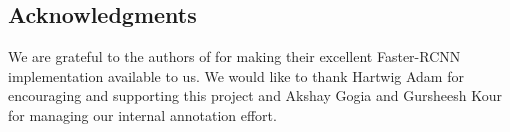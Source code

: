 \documentclass[10pt,twocolumn,letterpaper]{article}
\begin{document}
\subsection*{Acknowledgments}

We are grateful to the authors of \cite{huang2016speed} for making their excellent Faster-RCNN implementation available to us. We would like to thank Hartwig Adam for encouraging and supporting this project and Akshay Gogia and Gursheesh Kour for managing our internal annotation effort. 
{\small


}

\newpage
\end{document}

